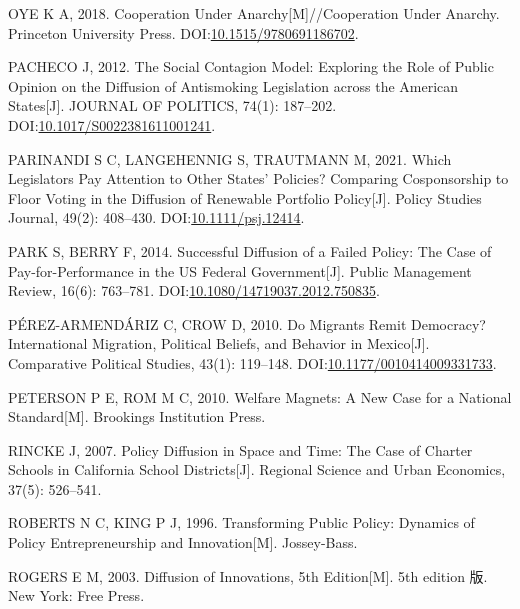 \documentclass[
  12pt,
]{ctexart}
\newlength{\cslhangindent}
\newlength{\cslentryspacingunit} %
\newenvironment{CSLReferences}[2] %
 {%
  \setlength{\parindent}{0pt}
  \ifodd #1
  \let\oldpar\par
  \def\par{\hangindent=\cslhangindent\oldpar}
  \fi
  \setlength{\parskip}{#2\cslentryspacingunit}
 }%
 {}
\begin{document}
\begin{CSLReferences}{1}{0}
\leavevmode{}%
OYE K A, 2018. Cooperation Under {Anarchy}{[}M{]}//Cooperation Under Anarchy. {Princeton University Press}. DOI:\href{https://doi.org/10.1515/9780691186702}{10.1515/9780691186702}.

\leavevmode{}%
PACHECO J, 2012. The {Social Contagion Model}: {Exploring} the {Role} of {Public Opinion} on the {Diffusion} of {Antismoking Legislation} across the {American States}{[}J{]}. JOURNAL OF POLITICS, 74(1): 187--202. DOI:\href{https://doi.org/10.1017/S0022381611001241}{10.1017/S0022381611001241}.

\leavevmode{}%
PARINANDI S C, LANGEHENNIG S, TRAUTMANN M, 2021. Which {Legislators Pay Attention} to {Other States}' {Policies}? {Comparing Cosponsorship} to {Floor Voting} in the {Diffusion} of {Renewable Portfolio Policy}{[}J{]}. Policy Studies Journal, 49(2): 408--430. DOI:\href{https://doi.org/10.1111/psj.12414}{10.1111/psj.12414}.

\leavevmode{}%
PARK S, BERRY F, 2014. Successful {Diffusion} of a {Failed Policy}: {The} Case of Pay-for-Performance in the {US} Federal Government{[}J{]}. Public Management Review, 16(6): 763--781. DOI:\href{https://doi.org/10.1080/14719037.2012.750835}{10.1080/14719037.2012.750835}.

\leavevmode{}%
PÉREZ-ARMENDÁRIZ C, CROW D, 2010. Do {Migrants Remit Democracy}? {International Migration}, {Political Beliefs}, and {Behavior} in {Mexico}{[}J{]}. Comparative Political Studies, 43(1): 119--148. DOI:\href{https://doi.org/10.1177/0010414009331733}{10.1177/0010414009331733}.

\leavevmode{}%
PETERSON P E, ROM M C, 2010. Welfare {Magnets}: {A New Case} for a {National Standard}{[}M{]}. {Brookings Institution Press}.

\leavevmode{}%
RINCKE J, 2007. Policy Diffusion in Space and Time: {The} Case of Charter Schools in {California} School Districts{[}J{]}. Regional Science and Urban Economics, 37(5): 526--541.

\leavevmode{}%
ROBERTS N C, KING P J, 1996. Transforming Public Policy: {Dynamics} of Policy Entrepreneurship and Innovation{[}M{]}. {Jossey-Bass}.

\leavevmode{}%
ROGERS E M, 2003. Diffusion of {Innovations}, 5th {Edition}{[}M{]}. 5th edition 版. {New York}: {Free Press}.


\end{CSLReferences}
\end{document}
